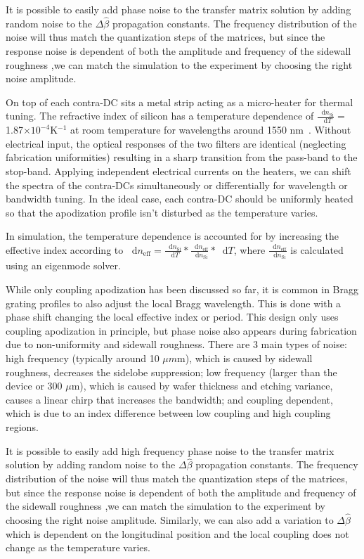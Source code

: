 \documentclass[osajnl,twocolumn,showpacs,superscriptaddress,10pt]{revtex4-1}
\newcommand*\diff{\mathop{}\!\mathrm{d}}
\begin{document}
It is possible to easily add phase noise to the transfer matrix solution by adding random noise to the $\Delta\hat{\beta}$ propagation constants. The frequency distribution of the noise will thus match the quantization steps of the matrices, but since the response noise is dependent of both the amplitude and frequency of the sidewall roughness \cite{simard2011impact},we can match the simulation to the experiment by choosing the right noise amplitude.


On top of each contra-DC sits a metal strip acting as a micro-heater for thermal tuning.  
The refractive index of silicon has a temperature dependence of $\frac{\diff{n_\text{Si}}}{\diff{T}}=$ 1.87$\times10^{-4}$K$^{-1}$ at room temperature for wavelengths around 1550 nm~\cite{frey2006temperature}.
Without electrical input, the optical responses of the two filters are identical (neglecting fabrication uniformities) resulting in a sharp transition from the pass-band to the stop-band. 
Applying independent electrical currents on the heaters, we can shift the spectra of the contra-DCs simultaneously or differentially for wavelength or bandwidth tuning.
In the ideal case, each contra-DC should be uniformly heated so that the apodization profile isn't disturbed as the temperature varies.

In simulation, the temperature dependence is accounted for by increasing the effective index according to 
$\diff{n_\text{eff}}=\frac{\diff{n_\text{Si}}}{\diff{T}}*\frac{\diff{n_\text{eff}}}{\diff{n_\text{Si}}}*\diff{T}$, where $\frac{\diff{n_\text{eff}}}{\diff{n_\text{Si}}}$ is calculated using an eigenmode solver.

While only coupling apodization has been discussed so far, it is common in Bragg grating profiles to also adjust the local Bragg wavelength. This is done with a phase shift changing the local effective index or period. This design only uses coupling apodization in principle, but phase noise also appears during fabrication due to non-uniformity and sidewall roughness.
There are 3 main types of noise: high frequency (typically around 10 $\mu m$m\cite{simard2013characterization}), which is caused by sidewall roughness, decreases the sidelobe suppression; low frequency (larger than the device or 300 $\mu$m), which is caused by wafer thickness and etching variance, causes a linear chirp that increases the bandwidth; and coupling dependent, which is due to an index difference between low coupling and high coupling regions.

It is possible to easily add high frequency phase noise to the transfer matrix solution by adding random noise to the $\Delta\hat{\beta}$ propagation constants. The frequency distribution of the noise will thus match the quantization steps of the matrices, but since the response noise is dependent of both the amplitude and frequency of the sidewall roughness \cite{simard2011impact},we can match the simulation to the experiment by choosing the right noise amplitude.
Similarly, we can also add a variation to $\Delta\hat{\beta}$ which is dependent on the longitudinal position and the local coupling does not change as the temperature varies.
\end{document}

